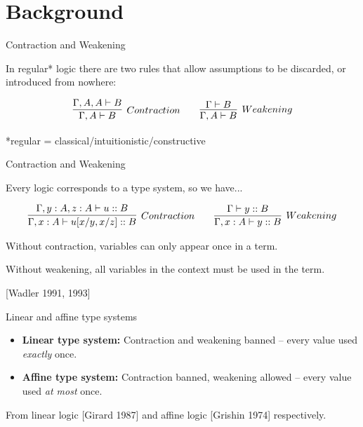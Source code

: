 \documentclass[10pt]{beamer}
\begin{document}
\section{Background}

\begin{frame}{Contraction and Weakening}

In regular* logic there are two rules that allow assumptions to be discarded, or introduced from nowhere:

$$
\infer[Contraction]{\Gamma, A \vdash B}{
	\Gamma, A, A \vdash B
}
\qquad
\infer[Weakening]{\Gamma, A \vdash B}{
    \Gamma \vdash B
}
$$

*regular = classical/intuitionistic/constructive

\end{frame}

\begin{frame}{Contraction and Weakening}

Every logic corresponds to a type system, so we have...

\begin{eqnarray*}
\infer[Contraction]{\Gamma, x : A \vdash u[x/y, x/z] :: B}{
	\Gamma, y : A, z : A \vdash u :: B
}
\qquad
\infer[Weakening]{\Gamma, x : A \vdash y :: B}{
    \Gamma\vdash y :: B
}
\end{eqnarray*}

Without contraction, variables can only appear once in a term.

Without weakening, all variables in the context must be used in the term.

[Wadler 1991, 1993]

\end{frame}

\begin{frame}{Linear and affine type systems}

\begin{itemize}
\item \textbf{Linear type system:} Contraction and weakening banned -- every value used \textit{exactly} once.
\item \textbf{Affine type system:} Contraction banned, weakening allowed -- every value used \textit{at most} once.
\end{itemize}

From linear logic [Girard 1987] and affine logic [Grishin 1974] respectively.

\end{frame}
\end{document}
